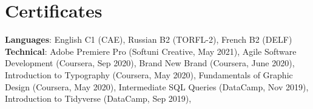 \section{Certificates}
 \begin{itemize}[leftmargin=0.15in, label={}]
  \small{\item{
    \textbf{Languages}{: English C1 (CAE), Russian B2 (TORFL-2), French B2 (DELF)} \\
    \textbf{Technical}{: Adobe Premiere Pro (Softuni Creative, May 2021), Agile Software Development (Coursera, Sep 2020), Brand New Brand (Coursera, June 2020), Introduction to Typography (Coursera, May 2020), Fundamentals of Graphic Design (Coursera, May 2020), Intermediate SQL Queries (DataCamp, Nov 2019), Introduction to Tidyverse (DataCamp, Sep 2019), 
}}}
 \end{itemize}
